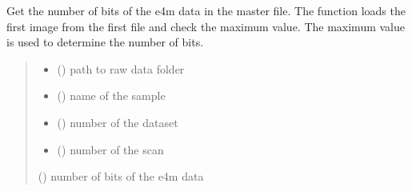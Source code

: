 \documentclass[letterpaper,10pt,english]{sphinxmanual}
\begin{document}
\begin{fulllineitems}
\label{\detokenize{index:ID10_tools.get_Nbit_v1}}
\pysigstartsignatures
\pysiglinewithargsret
{}
{\sphinxparamcomma {}\sphinxparamcomma {}\sphinxparamcomma {}}
{}
\pysigstopsignatures
\sphinxAtStartPar
Get the number of bits of the e4m data in the master file. The function loads the first image from the first file and check the maximum value. The maximum value is used to determine the number of bits.
\begin{quote}\begin{description}
\begin{itemize}
\item {} 
\sphinxAtStartPar
{} () \textendash{} path to raw data folder

\item {} 
\sphinxAtStartPar
{} () \textendash{} name of the sample

\item {} 
\sphinxAtStartPar
{} () \textendash{} number of the dataset

\item {} 
\sphinxAtStartPar
{} () \textendash{} number of the scan

\end{itemize}

\sphinxAtStartPar
{} () \textendash{} number of bits of the e4m data

\end{description}\end{quote}

\end{fulllineitems}

\end{document}
